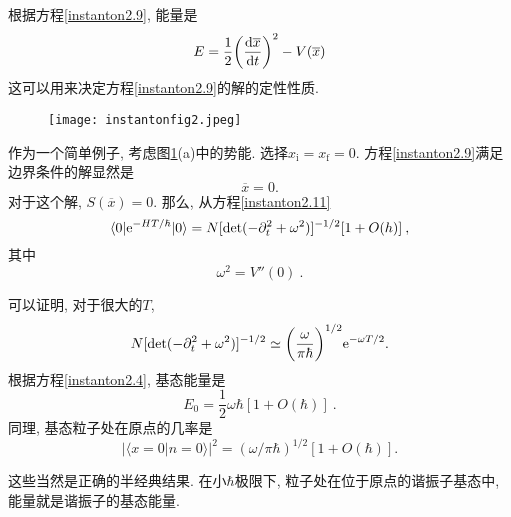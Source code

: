 根据方程\eqref{instanton2.9}, 能量是
\begin{equation}
    E=\frac{1}{2}\biggl(\frac{\mathrm{d}\overline{x}}{\mathrm{d} t}\biggr)^{2} - V(\overline{x})
\end{equation}
这可以用来决定方程\eqref{instanton2.9}的解的定性性质.

\begin{figure}[h]
    \centering
    \texttt{[image: instantonfig2.jpeg]}
    \caption{ \label{instantonfig2}}
  \end{figure}
作为一个简单例子, 考虑图\ref{instantonfig2}(a)中的势能. 选择$x_{\text{i}}=x_{\text{f}}=0$. 方程\eqref{instanton2.9}满足边界条件的解显然是
\begin{equation}
    \overline{x}=0 . \label{instanton2.13}
\end{equation}
对于这个解, $S(\overline{x})=0$. 那么, 从方程\eqref{instanton2.11}
\begin{equation}
    \langle 0 \vert \mathrm{e}^{-HT/\hbar} \vert 0\rangle = 
    N[\det(-\partial_{t}^{2}+\omega^{2})]^{-1/2}[1+O(h)] \:, \label{instanton2.14}
\end{equation}
其中
\begin{equation}
    \omega^{2}=V''(0) \:. \label{instanton2.15}
\end{equation}

可以证明, 对于很大的$T$,
\begin{equation}
    N[\det(-\partial_{t}^{2}+\omega^{2})]^{-1/2} \simeq \biggl(\frac{\omega}{\pi\hbar}\biggr)^{1/2}\mathrm{e}^{-\omega T/2}.  \label{instanton2.16}
\end{equation}
根据方程\eqref{instanton2.4}, 基态能量是
\begin{equation}
    E_{0}=\frac{1}{2}\omega\hbar[1+O(\hbar)] \:. \label{instanton2.17}
\end{equation}
同理, 基态粒子处在原点的几率是
\begin{equation}
     \bigl\lvert \langle x{=}0 \vert n{=}0 \rangle \bigr\rvert^{2} =
     (\omega/\pi\hbar)^{1/2}[1+O(\hbar)] .
\end{equation}

这些当然是正确的半经典结果. 在小$\hbar$极限下, 粒子处在位于原点的谐振子基态中, 能量就是谐振子的基态能量.

